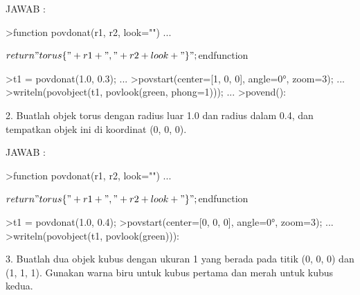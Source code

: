 \documentclass{article}
\begin{document}
\begin{eulernotebook}
\begin{eulercomment}
\begin{eulercomment}
\begin{eulercomment}
\begin{eulercomment}
\begin{eulercomment}
\begin{eulercomment}
\begin{eulercomment}
\begin{eulercomment}
\begin{eulercomment}
\begin{eulercomment}
\begin{eulercomment}
\begin{eulercomment}
\begin{eulercomment}
\begin{eulercomment}
\begin{eulercomment}
\begin{eulercomment}
\begin{eulercomment}
\begin{eulercomment}
\begin{eulercomment}
\begin{eulercomment}
\begin{eulercomment}
\begin{eulercomment}
\begin{eulercomment}
\begin{eulercomment}
\begin{eulercomment}
\begin{eulercomment}
\begin{eulercomment}
\begin{eulercomment}
\begin{eulercomment}
\begin{eulercomment}
\begin{eulercomment}
JAWAB :
\end{eulercomment}
\begin{eulerprompt}
>function povdonat(r1, r2, look="") ...
\end{eulerprompt}
\begin{eulerudf}
  $  return "torus \{" + r1 + "," + r2 + look + "\}";
  $endfunction
\end{eulerudf}
\begin{eulerprompt}
>t1 = povdonat(1.0, 0.3); ...
>povstart(center=[1, 0, 0], angle=0°, zoom=3); ...
>writeln(povobject(t1, povlook(green, phong=1))); ...
>povend():
\end{eulerprompt}
\begin{eulercomment}
2. Buatlah objek torus dengan radius luar 1.0 dan radius dalam 0.4,
dan tempatkan objek ini di koordinat (0, 0, 0).

JAWAB :
\end{eulercomment}
\begin{eulerprompt}
>function povdonat(r1, r2, look="") ...
\end{eulerprompt}
\begin{eulerudf}
  $  return "torus \{" + r1 + "," + r2 + look + "\}";
  $endfunction
\end{eulerudf}
\begin{eulerprompt}
>t1 = povdonat(1.0, 0.4);
>povstart(center=[0, 0, 0], angle=0°, zoom=3); ...
>writeln(povobject(t1, povlook(green))):
\end{eulerprompt}
\begin{eulercomment}
3. Buatlah dua objek kubus dengan ukuran 1 yang berada pada titik (0,
0, 0) dan (1, 1, 1). Gunakan warna biru untuk kubus pertama dan merah
untuk kubus kedua.


\end{eulercomment}
\end{eulercomment}
\end{eulercomment}
\end{eulercomment}
\end{eulercomment}
\end{eulercomment}
\end{eulercomment}
\end{eulercomment}
\end{eulercomment}
\end{eulercomment}
\end{eulercomment}
\end{eulercomment}
\end{eulercomment}
\end{eulercomment}
\end{eulercomment}
\end{eulercomment}
\end{eulercomment}
\end{eulercomment}
\end{eulercomment}
\end{eulercomment}
\end{eulercomment}
\end{eulercomment}
\end{eulercomment}
\end{eulercomment}
\end{eulercomment}
\end{eulercomment}
\end{eulercomment}
\end{eulercomment}
\end{eulercomment}
\end{eulercomment}
\end{eulercomment}
\end{eulernotebook}
\end{document}
